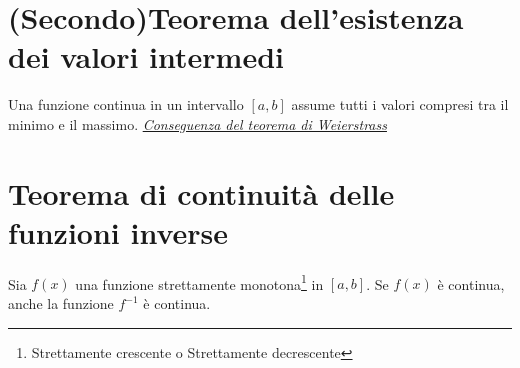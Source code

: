 \documentclass{article}
\begin{document}
\section{(Secondo)Teorema dell'esistenza dei valori intermedi}
Una funzione continua in un intervallo $[a,b]$ assume tutti i valori compresi tra il minimo e il massimo. \underline{\textit {Conseguenza del teorema di Weierstrass}}
\section{Teorema di continuità delle funzioni inverse}
Sia $f(x)$ una funzione strettamente monotona\footnote{Strettamente crescente o Strettamente decrescente} in $[a,b]$. Se $f(x)$ è continua, anche la funzione $f^{-1}$ è continua.
\end{document}
